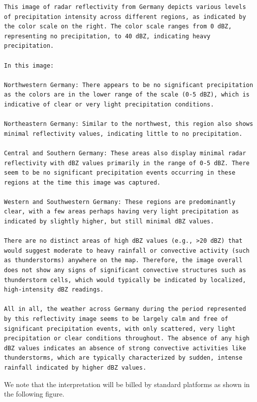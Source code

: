 \begin{lstlisting}[style=mdstyle]
This image of radar reflectivity from Germany depicts various levels of precipitation intensity across different regions, as indicated by the color scale on the right. The color scale ranges from 0 dBZ, representing no precipitation, to 40 dBZ, indicating heavy precipitation.

In this image:

Northwestern Germany: There appears to be no significant precipitation as the colors are in the lower range of the scale (0-5 dBZ), which is indicative of clear or very light precipitation conditions.

Northeastern Germany: Similar to the northwest, this region also shows minimal reflectivity values, indicating little to no precipitation.

Central and Southern Germany: These areas also display minimal radar reflectivity with dBZ values primarily in the range of 0-5 dBZ. There seem to be no significant precipitation events occurring in these regions at the time this image was captured.

Western and Southwestern Germany: These regions are predominantly clear, with a few areas perhaps having very light precipitation as indicated by slightly higher, but still minimal dBZ values.

There are no distinct areas of high dBZ values (e.g., >20 dBZ) that would suggest moderate to heavy rainfall or convective activity (such as thunderstorms) anywhere on the map. Therefore, the image overall does not show any signs of significant convective structures such as thunderstorm cells, which would typically be indicated by localized, high-intensity dBZ readings.

All in all, the weather across Germany during the period represented by this reflectivity image seems to be largely calm and free of significant precipitation events, with only scattered, very light precipitation or clear conditions throughout. The absence of any high dBZ values indicates an absence of strong convective activities like thunderstorms, which are typically characterized by sudden, intense rainfall indicated by higher dBZ values.
\end{lstlisting}

We note that the interpretation will be billed by standard platforms as shown in the following figure. 

